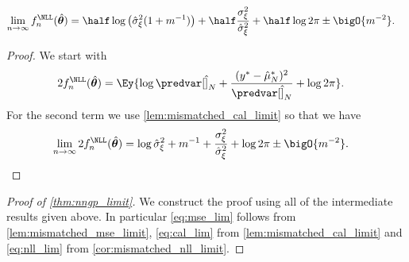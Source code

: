 \begin{corollary}
    \label{cor:mismatched_nll_limit}
    \begin{align*}
    \lim_{n\rightarrow\infty}f_n^{\NLL}(\hat{\bm{\theta}}) &= \half\log\left(\hat{\sigma}_\xi^2(1 + m^{-1})\right) + \half\frac{\sigma_\xi^2}{\hat{\sigma}_\xi^2} +\half\log2\pi \pm \bigO{m^{-2}}. 
    \end{align*}
\end{corollary}
\begin{proof}\label{proof:mismatched_nll_limit}
We start with
    \begin{align*}
        2f_n^{\NLL}(\hat{\bm{\theta}}) &= \Ey{\log\predvar[\hat]_N + \frac{(y^*-\hat{\mu}_N^*)^2}{\predvar[\hat]_N} + \log2\pi}.
    \end{align*}
        For the second term we use \autoref{lem:mismatched_cal_limit} so that we have 
    \begin{align*}
        \lim_{n\rightarrow\infty}2f_n^{\NLL}(\hat{\bm{\theta}}) &= \log\hat{\sigma}_\xi^2 +  m^{-1} + \frac{\sigma_\xi^2}{\hat{\sigma}_\xi^2} +\log2\pi \pm \bigO{m^{-2}}.
    \end{align*}
\end{proof}

\begin{proof}[Proof of \autoref{thm:nngp_limit}]\label{proof:nngp_limit}
    We construct the proof using all of the intermediate results given above. In particular \autoref{eq:mse_lim} follows from \autoref{lem:mismatched_mse_limit}, \autoref{eq:cal_lim} from \autoref{lem:mismatched_cal_limit} and \autoref{eq:nll_lim} from \autoref{cor:mismatched_nll_limit}.
\end{proof}

